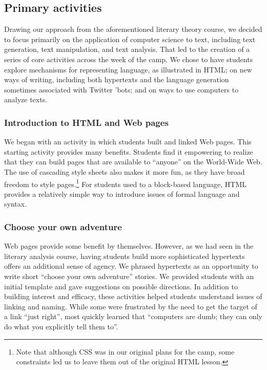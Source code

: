 \subsection{Primary activities}

Drawing our approach from the aforementioned literary theory course,
we decided to focus primarily on the application of computer science
to text, including text generation, text manipulation, and text
analysis.  That led to the creation of a series of core activities
across the week of the camp.  We chose to have students explore
mechanisms for representing language, as illustrated in HTML; on
new ways of writing, including both hypertexts and the language
generation sometimes associated with Twitter 'bots; and on ways to
use computers to analyze texts.

\subsubsection{Introduction to HTML and Web pages}

We began with an activity in which students built and linked Web
pages.  This starting activity provides many benefits.  Students find it
empowering to realize that they can build pages that are available
to ``anyone'' on the World-Wide Web.  The use of cascading style
sheets also makes it more fun, as they have broad freedom to style
pages.\footnote{Note that although CSS was in our original plans
for the camp, some constraints led us to leave them out of the
original HTML lesson.}  For students used to a block-based language,
HTML provides a relatively simple way to introduce issues of formal
language and syntax.

\subsubsection{Choose your own adventure}

Web pages provide some benefit by themselves.  However, as we had seen
in the literary analysis course, having students build more sophisticated
hypertexts offers an additional sense of agency.  We phrased hypertexts
as an opportunity to write short ``choose your own adventure'' stories.
We provided students with an initial template and gave suggestions on
possible directions.  In addition to building interest and efficacy, these
activities helped students understand issues of linking and naming.
While some were frustrated by the need to get the target of a link
``just right'', most quickly learned that ``computers are dumb; they
can only do what you explicitly tell them to''.

